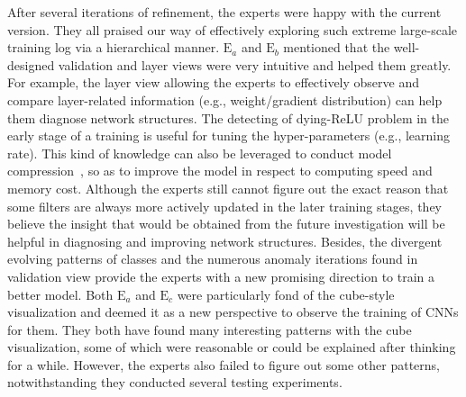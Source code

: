 \documentclass[format=acmsmall, review=false, screen=true]{acmart}
\newcommand{\ea}{{$\mathrm{E}_a$}\xspace}
\newcommand{\eb}{{$\mathrm{E}_b$}\xspace}
\newcommand{\ec}{{$\mathrm{E}_c$}\xspace}
\begin{document}
After several iterations of refinement, the experts were happy with the current version. They all praised our way of effectively exploring such extreme large-scale training log via a hierarchical manner. 
\ea and \eb mentioned that the well-designed validation and layer views were very intuitive and helped them greatly. For example, the layer view allowing the experts to effectively observe and compare layer-related information (e.g., weight/gradient distribution) can help them diagnose network structures. The detecting of dying-ReLU problem in the early stage of a training is useful for tuning the hyper-parameters (e.g., learning rate). This kind of knowledge can also be leveraged to conduct model compression~\cite{han2015deep}, so as to improve the model in respect to computing speed and memory cost. Although the experts still cannot figure out the exact reason that some filters are always more actively updated in the later training stages, they believe the insight that would be obtained from the future investigation will be helpful in diagnosing and improving network structures. Besides, the divergent evolving patterns of classes and the numerous anomaly iterations found in validation view provide the experts with a new promising direction to train a better model.
Both \ea and \ec were particularly fond of the cube-style visualization and deemed it as a new perspective to observe the training of CNNs for them. 
They both have found many interesting patterns with the cube visualization, some of which were reasonable or could be explained after thinking for a while.
However, the experts also failed to figure out some other patterns, notwithstanding they conducted several testing experiments. 
\end{document}
